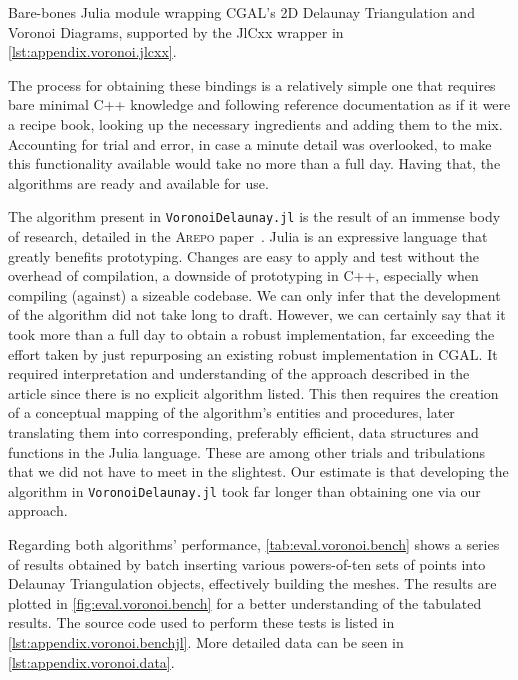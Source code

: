 \begin{listing}[htb]
  \inputminted{julia}{jl/Voronoi.jl}
  \caption[Bare-bones Julia module wrapping CGAL's Delaunay algorithms]{
    Bare-bones Julia module wrapping \ac{CGAL}'s 2D Delaunay Triangulation and
    Voronoi Diagrams, supported by the JlCxx wrapper in
    \cref{lst:appendix.voronoi.jlcxx}.}%
  \label{lst:eval.voronoi.jl}
\end{listing}

The process for obtaining these bindings is a relatively simple one that
requires bare minimal C++ knowledge and following reference documentation as if
it were a recipe book, looking up the necessary ingredients and adding them to
the mix.  Accounting for trial and error, in case a minute detail was
overlooked, to make this functionality available would take no more than a full
day.  Having that, the algorithms are ready and available for use.

The algorithm present in \texttt{VoronoiDelaunay.jl} is the result of an immense
body of research, detailed in the \textsc{Arepo}
paper~\cite{Springel:2010:GCHSMM}.  Julia is an expressive language that greatly
benefits prototyping.  Changes are easy to apply and test without the overhead
of compilation, a downside of prototyping in C++, especially when compiling
(against) a sizeable codebase.  We can only infer that the development of the
algorithm did not take long to draft.  However, we can certainly say that it
took more than a full day to obtain a robust implementation, far exceeding the
effort taken by just repurposing an existing robust implementation in \ac{CGAL}.
It required interpretation and understanding of the approach described in the
article since there is no explicit algorithm listed.  This then requires the
creation of a conceptual mapping of the algorithm's entities and procedures,
later translating them into corresponding, preferably efficient, data structures
and functions in the Julia language.  These are among other trials and
tribulations that we did not have to meet in the slightest.  Our estimate is
that developing the algorithm in \texttt{VoronoiDelaunay.jl} took far longer
than obtaining one via our approach.

Regarding both algorithms' performance, \cref{tab:eval.voronoi.bench} shows a
series of results obtained by batch inserting various powers-of-ten sets of
points into Delaunay Triangulation objects, effectively building the meshes.
The results are plotted in \cref{fig:eval.voronoi.bench} for a better
understanding of the tabulated results.  The source code used to perform these
tests is listed in \cref{lst:appendix.voronoi.benchjl}.  More detailed data can
be seen in \cref{lst:appendix.voronoi.data}.


